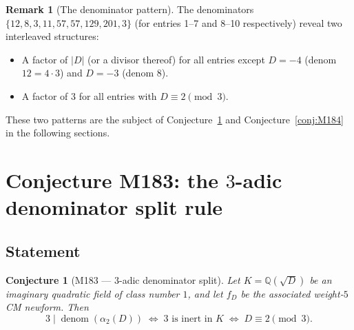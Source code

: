 \documentclass[12pt]{amsart}
\newtheorem{conjecture}[theorem]{Conjecture}
\theoremstyle{definition}
\newtheorem{remark}[theorem]{Remark}
\DeclareMathOperator{\denom}{denom}
\newcommand{\Q}{\mathbb{Q}}
\begin{document}
\begin{remark}[The denominator pattern]
  The denominators $\{12, 8, 3, 11, 57, 57, 129, 201, 3\}$ (for entries
  1--7 and 8--10 respectively) reveal two interleaved structures:
  \begin{itemize}
    \item A factor of $|D|$ (or a divisor thereof) for all entries except
      $D=-4$ (denom $12 = 4 \cdot 3$) and $D=-3$ (denom $8$).
    \item A factor of $3$ for all entries with $D \equiv 2 \pmod 3$.
  \end{itemize}
  These two patterns are the subject of Conjecture~\ref{conj:M183} and
  Conjecture~\ref{conj:M184} in the following sections.
\end{remark}

\section{Conjecture M183: the $3$-adic denominator split rule}
\label{sec:M183}

\subsection{Statement}

\begin{conjecture}[M183 --- $3$-adic denominator split]
  \label{conj:M183}
  Let $K = \Q(\sqrt{D})$ be an imaginary quadratic field of class number $1$,
  and let $f_D$ be the associated weight-$5$ CM newform.
  Then
  \[
    3 \mid \denom(\alpha_2(D)) \;\iff\; \text{$3$ is inert in $K$}
    \;\iff\; D \equiv 2 \pmod{3}.
  \]
\end{conjecture}
\end{document}
